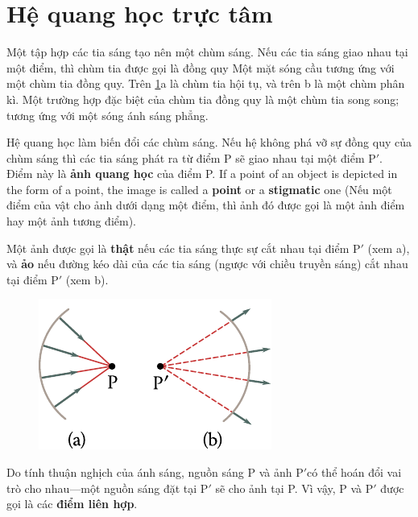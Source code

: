 \section{Hệ quang học trực tâm}\label{sec:16_7}

Một tập hợp các tia sáng tạo nên một chùm sáng.
Nếu các tia sáng giao nhau tại một điểm, thì chùm tia được gọi là đồng quy
Một mặt sóng cầu tương ứng với một chùm tia đồng quy.
Trên \ref{fig:16_12}a là chùm tia hội tụ, và trên b là một chùm phân kì.
Một trường hợp đặc biệt của chùm tia đồng quy là một chùm tia song song; tương ứng với một sóng ánh sáng phẳng.

Hệ quang học làm biến đổi các chùm sáng.
Nếu hệ không phá vỡ sự đồng quy của chùm sáng thì các tia sáng phát ra từ điểm P sẽ giao nhau tại một điểm P$'$.
Điểm này là \textbf{ảnh quang học} của điểm P. If a point of an object is depicted in the form of a point, the image is called a \textbf{point} or a \textbf{stigmatic} one (Nếu một điểm của vật cho ảnh dưới dạng một điểm, thì ảnh đó được gọi là một ảnh điểm hay một ảnh tương điểm).

Một ảnh được gọi là \textbf{thật} nếu các tia sáng thực sự cắt nhau tại điểm P$'$ (xem a), và \textbf{ảo} nếu đường kéo dài của các tia sáng (ngược với chiều truyền sáng) cắt nhau tại điểm P$'$ (xem b).

\begin{figure}[t]
	\begin{center}
		\includegraphics[scale=1]{figures/ch_16/fig_16_12.pdf}
        \caption[]{}
		\label{fig:16_12}
	\end{center}
	\vspace{-0.8cm}
\end{figure}

Do tính thuận nghịch của ánh sáng, nguồn sáng P và ảnh P$'$có thể hoán đổi vai trò cho nhau---một nguồn sáng đặt tại P$'$ sẽ cho ảnh tại P.
Vì vậy, P và P$'$ được gọi là các \textbf{điểm liên hợp}.

